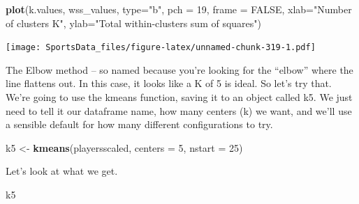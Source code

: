 \documentclass[
]{book}
\newenvironment{Shaded}{\begin{snugshade}}{\end{snugshade}}
\newcommand{\DataTypeTok}[1]{\textcolor[rgb]{0.13,0.29,0.53}{#1}}
\newcommand{\DecValTok}[1]{\textcolor[rgb]{0.00,0.00,0.81}{#1}}
\newcommand{\KeywordTok}[1]{\textcolor[rgb]{0.13,0.29,0.53}{\textbf{#1}}}
\newcommand{\NormalTok}[1]{#1}
\newcommand{\OtherTok}[1]{\textcolor[rgb]{0.56,0.35,0.01}{#1}}
\newcommand{\StringTok}[1]{\textcolor[rgb]{0.31,0.60,0.02}{#1}}
\begin{document}
\begin{Shaded}
\begin{Highlighting}[]
\KeywordTok{plot}\NormalTok{(k.values, wss_values,}
       \DataTypeTok{type=}\StringTok{"b"}\NormalTok{, }\DataTypeTok{pch =} \DecValTok{19}\NormalTok{, }\DataTypeTok{frame =} \OtherTok{FALSE}\NormalTok{, }
       \DataTypeTok{xlab=}\StringTok{"Number of clusters K"}\NormalTok{,}
       \DataTypeTok{ylab=}\StringTok{"Total within-clusters sum of squares"}\NormalTok{)}
\end{Highlighting}
\end{Shaded}

\texttt{[image: SportsData\_files/figure-latex/unnamed-chunk-319-1.pdf]}

The Elbow method -- so named because you're looking for the ``elbow'' where the line flattens out. In this case, it looks like a K of 5 is ideal. So let's try that. We're going to use the kmeans function, saving it to an object called k5. We just need to tell it our dataframe name, how many centers (k) we want, and we'll use a sensible default for how many different configurations to try.

\begin{Shaded}
\begin{Highlighting}[]
\NormalTok{k5 <-}\StringTok{ }\KeywordTok{kmeans}\NormalTok{(playersscaled, }\DataTypeTok{centers =} \DecValTok{5}\NormalTok{, }\DataTypeTok{nstart =} \DecValTok{25}\NormalTok{)}
\end{Highlighting}
\end{Shaded}

Let's look at what we get.

\begin{Shaded}
\begin{Highlighting}[]
\NormalTok{k5}
\end{Highlighting}
\end{Shaded}
\end{document}
